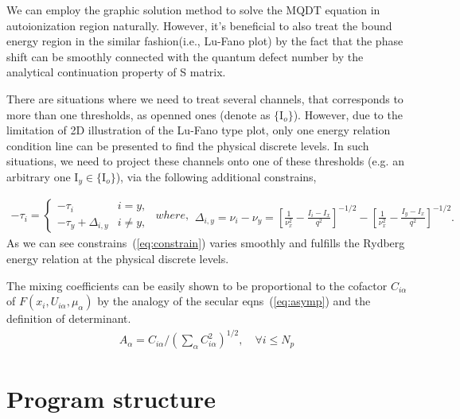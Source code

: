 \documentclass[11pt]{article}
\begin{document}
We can employ the graphic solution method to solve the MQDT equation in autoionization region naturally. However, it's beneficial to also treat the bound energy region in the similar fashion(i.e., Lu-Fano plot) by the fact that the phase shift can be smoothly connected with the quantum defect number by the analytical continuation property of S matrix.

There are situations where we need to treat several channels, that corresponds to more than one thresholds, as openned ones (denote as $\{\text{I}_{o}\}$).  However, due to the limitation of 2D illustration of the Lu-Fano type plot, only one energy relation condition line can be presented to find the physical discrete levels.  In such situations, we need to project these channels onto one of these thresholds (e.g. an arbitrary one $\mathrm{I}_y\in\{\text{I}_{o}\}$), via the following additional constrains, 

\begin{subequations}
\label{eq:constrain}
\begin{eqnarray}
-\tau_i = 
\begin{cases}
{\displaystyle -\tau_i} & i = y,\\
{\displaystyle -\tau_{y} + \Delta_{i,y}}&  i\neq y,
\end{cases}
\end{eqnarray}
where,
\begin{eqnarray}
\Delta_{i,y} = \nu_{i}-\nu_{y}=\left[\frac{1}{\nu^2_{x}}-\frac{I_i-I_{x}}{q^2}\right]^{-1/2}- \left[\frac{1}{\nu^2_{x}}-\frac{I_y-I_{x}}{q^2}\right]^{-1/2}.
\end{eqnarray}
\end{subequations}
As we can see constrains~(\ref{eq:constrain}) varies smoothly and fulfills the Rydberg energy relation at the physical discrete levels.

The mixing coefficients can be easily shown to be proportional to the cofactor $C_{i\alpha}$ of $F({x_i},{U_{i\alpha},\mu_\alpha})$ by the analogy of the secular eqns~(\ref{eq:asymp}) and the definition of determinant.  
\begin{eqnarray}
A_\alpha=C_{i\alpha}/(\sum_{\alpha}C_{i\alpha}^2)^{1/2},\quad \forall i \leq N_p
\end{eqnarray}


\section{\label{sec:program}Program structure} 
\end{document}
